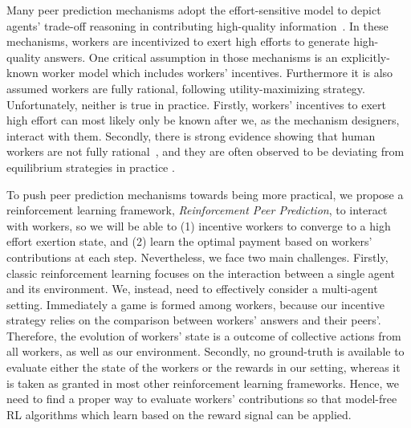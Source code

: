 \documentclass{article}
\begin{document}
Many peer prediction mechanisms adopt the effort-sensitive model to depict agents' trade-off reasoning in contributing high-quality information~\cite{witkowski2013dwelling,dasgupta2013crowdsourced,shnayder2016informed,liu2017sequential}. In these mechanisms, workers are incentivized to exert high efforts to generate high-quality answers.
 One critical assumption in those mechanisms is an explicitly-known worker model which includes workers' incentives. Furthermore it is also assumed workers are fully rational, following utility-maximizing strategy. Unfortunately, neither is true in practice. Firstly, workers' incentives %
  to exert high effort can most likely only be known after we, as the mechanism designers, interact with them. Secondly, there is strong evidence showing that human workers are not fully rational~\cite{simon1979rational}, and they are often observed to be deviating from equilibrium strategies in practice \cite{mckelvey1995quantal,jurca2007robust}.



To push peer prediction mechanisms towards being more practical, we propose a reinforcement learning framework, \emph{Reinforcement Peer Prediction}, to interact with workers, so we will be able to (1) incentive workers to converge to a high effort exertion state, and (2) learn the optimal payment based on workers' contributions at each step.
Nevertheless, we face two main challenges.
Firstly, classic reinforcement learning focuses on the interaction between a single agent and its environment. We, instead, need to effectively consider a multi-agent setting. Immediately a game is formed among workers, because our incentive strategy relies on the comparison between workers' answers and their peers'. Therefore, the evolution of workers' state is a outcome of collective actions from all workers, as well as our environment. Secondly, no ground-truth is available to evaluate either the state of the workers or the rewards in our setting, whereas it is taken as granted in most other reinforcement learning frameworks. Hence, we need to find a proper way to evaluate workers' contributions so that model-free RL algorithms which learn based on the reward signal can be applied.
\end{document}
